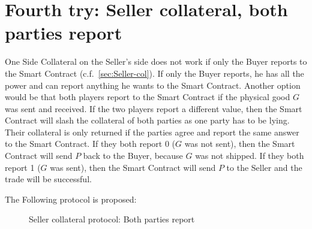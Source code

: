 \documentclass{cacthesis}
\newcommand{\authnote}[3]{{ \footnotesize \textbf{#1[#2: #3]~}}}
\newcommand{\orfnote}[1]{\authnote{\color{blue}}{Orfeas}{#1}}
\begin{document}
\section{Fourth try: Seller collateral, both parties report}
\label{sec:Sellercol-both-report}
One Side Collateral on the Seller's side does not work if only the Buyer reports
to the Smart Contract (c.f.~\ref{sec:Seller-col}). If only the Buyer reports, he has all the power and can report anything he wants to the Smart Contract.
Another option would be that both players report to the Smart Contract if the physical good $G$ was sent and received.
If the two players report a different value, then the Smart Contract will slash
the collateral of both parties as one party has to be lying. Their collateral is only returned if the parties
agree and report the same answer to the Smart Contract. If they both report 0 ($G$ was not sent),
then the Smart Contract will send $P$ back to the Buyer, because $G$ was not
shipped. If they both report 1 ($G$ was sent), then the Smart Contract will send
$P$ to the Seller and the trade will be successful.\newline

The Following protocol is proposed:
\begin{figure}[htb!]
    \centering
    \caption{Seller collateral protocol: Both parties report}
    \label{pro:Seller-col-both-report}
\end{figure}
\end{document}
